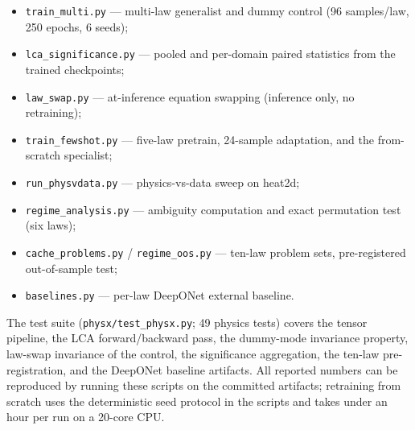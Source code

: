 \documentclass[11pt,a4paper]{article}
\newcommand{\LCA}{{\scshape LCA}}
\begin{document}
\begin{itemize}[leftmargin=1.6em,itemsep=0.15em]
  \item \texttt{train\_multi.py} --- multi-law generalist and dummy control
  (96 samples/law, 250 epochs, 6 seeds);
  \item \texttt{lca\_significance.py} --- pooled and per-domain paired
  statistics from the trained checkpoints;
  \item \texttt{law\_swap.py} --- at-inference equation swapping (inference
  only, no retraining);
  \item \texttt{train\_fewshot.py} --- five-law pretrain, 24-sample
  adaptation, and the from-scratch specialist;
  \item \texttt{run\_physvdata.py} --- physics-vs-data sweep on heat2d;
  \item \texttt{regime\_analysis.py} --- ambiguity computation and exact
  permutation test (six laws);
  \item \texttt{cache\_problems.py} / \texttt{regime\_oos.py} --- ten-law
  problem sets, pre-registered out-of-sample test;
  \item \texttt{baselines.py} --- per-law DeepONet external baseline.
\end{itemize}

The test suite (\texttt{physx/test\_physx.py}; 49 physics tests) covers the
tensor pipeline, the \LCA{} forward/backward pass, the dummy-mode
invariance property, law-swap invariance of the control, the significance
aggregation, the ten-law pre-registration, and the DeepONet baseline
artifacts. All reported numbers can be reproduced by running these scripts
on the committed artifacts; retraining from scratch uses the deterministic
seed protocol in the scripts and takes under an hour per run on a 20-core
CPU.
\end{document}
